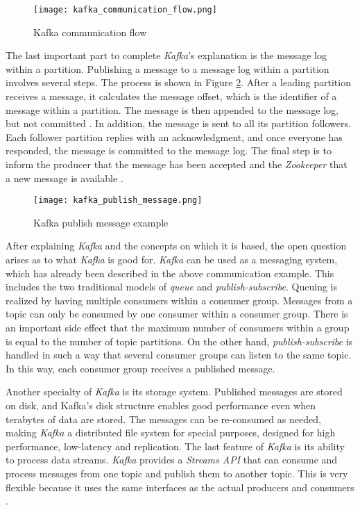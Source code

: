 \begin{figure}
	\centering
	\texttt{[image: kafka\_communication\_flow.png]}
	\caption{Kafka communication flow}
	\label{img:kafkacomflow}
\end{figure}

The last important part to complete \textit{Kafka}'s explanation is the message log within a partition.
Publishing a message to a message log within a partition involves several steps.
The process is shown in Figure \ref{img:kafkapubmsg}.
After a leading partition receives a message, it calculates the message offset, which is the identifier of a message within a partition.
The message is then appended to the message log, but not committed \cite[p.~18]{Stopford.2018}.
In addition, the message is sent to all its partition followers.
Each follower partition replies with an acknowledgment, and once everyone has responded, the message is committed to the message log.
The final step is to inform the producer that the message has been accepted and the \textit{Zookeeper} that a new message is available \cite[p.~36]{Kumar.2017}.

\begin{figure}
	\centering
	\texttt{[image: kafka\_publish\_message.png]}
	\caption{Kafka publish message example}
	\label{img:kafkapubmsg}
\end{figure}

After explaining \textit{Kafka} and the concepts on which it is based, the open question arises as to what \textit{Kafka} is good for.
\textit{Kafka} can be used as a messaging system, which has already been described in the above communication example.
This includes the two traditional models of \textit{queue} and \textit{publish-subscribe}.
Queuing is realized by having multiple consumers within a consumer group.
Messages from a topic can only be consumed by one consumer within a consumer group.
There is an important side effect that the maximum number of consumers within a group is equal to the number of topic partitions.
On the other hand, \textit{publish-subscribe} is handled in such a way that several consumer groups can listen to the same topic.
In this way, each consumer group receives a published message.

Another specialty of \textit{Kafka} is its storage system.
Published messages are stored on disk, and Kafka’s disk structure enables good performance even when terabytes of data are stored.
The messages can be re-consumed as needed, making \textit{Kafka} a distributed file system for special purposes, designed for high performance, low-latency and replication.
The last feature of \textit{Kafka} is its ability to process data streams.
\textit{Kafka} provides a \textit{Streams API} that can consume and process messages from one topic and publish them to another topic.
This is very flexible because it uses the same interfaces as the actual producers and consumers \cite{ApacheKafka.01.06.2020}.

